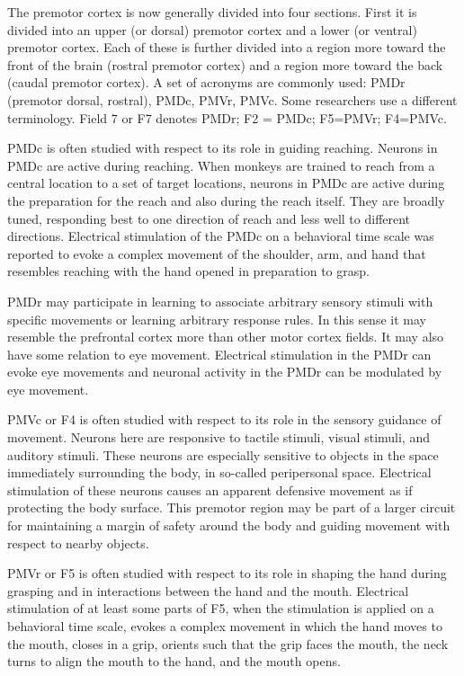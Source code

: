 The premotor cortex is now generally divided into four sections. First it is divided into an upper (or dorsal) premotor cortex and a lower (or ventral) premotor cortex. Each of these is further divided into a region more toward the front of the brain (rostral premotor cortex) and a region more toward the back (caudal premotor cortex). A set of acronyms are commonly used: PMDr (premotor dorsal, rostral), PMDc, PMVr, PMVc. Some researchers use a different terminology. Field 7 or F7 denotes PMDr; F2 = PMDc; F5=PMVr; F4=PMVc.

PMDc is often studied with respect to its role in guiding reaching. Neurons in PMDc are active during reaching. When monkeys are trained to reach from a central location to a set of target locations, neurons in PMDc are active during the preparation for the reach and also during the reach itself. They are broadly tuned, responding best to one direction of reach and less well to different directions. Electrical stimulation of the PMDc on a behavioral time scale was reported to evoke a complex movement of the shoulder, arm, and hand that resembles reaching with the hand opened in preparation to grasp.

PMDr may participate in learning to associate arbitrary sensory stimuli with specific movements or learning arbitrary response rules. In this sense it may resemble the prefrontal cortex more than other motor cortex fields. It may also have some relation to eye movement. Electrical stimulation in the PMDr can evoke eye movements and neuronal activity in the PMDr can be modulated by eye movement.

PMVc or F4 is often studied with respect to its role in the sensory guidance of movement. Neurons here are responsive to tactile stimuli, visual stimuli, and auditory stimuli. These neurons are especially sensitive to objects in the space immediately surrounding the body, in so-called peripersonal space. Electrical stimulation of these neurons causes an apparent defensive movement as if protecting the body surface. This premotor region may be part of a larger circuit for maintaining a margin of safety around the body and guiding movement with respect to nearby objects.

PMVr or F5 is often studied with respect to its role in shaping the hand during grasping and in interactions between the hand and the mouth. Electrical stimulation of at least some parts of F5, when the stimulation is applied on a behavioral time scale, evokes a complex movement in which the hand moves to the mouth, closes in a grip, orients such that the grip faces the mouth, the neck turns to align the mouth to the hand, and the mouth opens.

